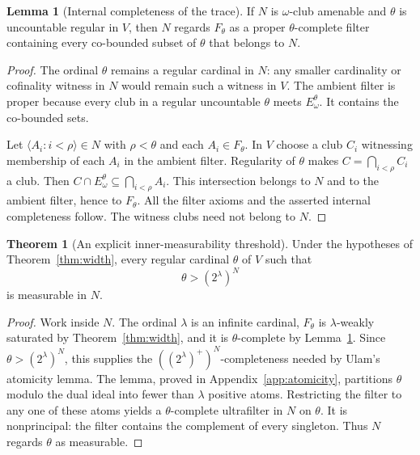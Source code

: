 \documentclass[11pt,letterpaper]{article}
\theoremstyle{definition}
\newtheorem{theorem}[definition]{Theorem}
\newtheorem{lemma}[definition]{Lemma}
\numberwithin{equation}{section}
\begin{document}
\begin{lemma}[Internal completeness of the trace]\label{lem:filtercomplete}
If $N$ is $\omega$-club amenable and $\theta$ is uncountable regular in
$V$, then $N$ regards $F_\theta$ as a proper $\theta$-complete filter
containing every co-bounded subset of $\theta$ that belongs to $N$.
\end{lemma}
\begin{proof}
The ordinal $\theta$ remains a regular cardinal in $N$: any smaller
cardinality or cofinality witness in $N$ would remain such a witness
in $V$. The ambient filter is proper because every club in a regular
uncountable $\theta$ meets $E^\theta_\omega$. It contains the
co-bounded sets.

Let $\langle A_i:i<\rho\rangle\in N$ with $\rho<\theta$ and each
$A_i\in F_\theta$. In $V$ choose a club $C_i$ witnessing membership
of each $A_i$ in the ambient filter. Regularity of $\theta$ makes
$C=\bigcap_{i<\rho}C_i$ a club. Then
$C\cap E^\theta_\omega\subseteq\bigcap_{i<\rho}A_i$.
This intersection belongs to $N$ and to the ambient filter, hence to
$F_\theta$. All the filter axioms and the asserted internal
completeness follow. The witness clubs need not belong to $N$.
\end{proof}

\begin{theorem}[An explicit inner-measurability threshold]\label{thm:measurable}
Under the hypotheses of Theorem~\ref{thm:width}, every regular cardinal
$\theta$ of $V$ such that
\[
\theta>(2^\lambda)^N
\]
is measurable in $N$.
\end{theorem}
\begin{proof}
Work inside $N$. The ordinal $\lambda$ is an infinite cardinal,
$F_\theta$ is $\lambda$-weakly saturated by
Theorem~\ref{thm:width}, and it is $\theta$-complete by
Lemma~\ref{lem:filtercomplete}. Since
$\theta>(2^\lambda)^N$, this supplies the
$((2^\lambda)^+)^N$-completeness needed by Ulam's atomicity lemma.
The lemma, proved in Appendix~\ref{app:atomicity}, partitions
$\theta$ modulo the dual ideal into fewer than $\lambda$ positive
atoms. Restricting the filter to any one of these atoms yields a
$\theta$-complete ultrafilter in $N$ on $\theta$. It is nonprincipal:
the filter contains the complement of every singleton. Thus $N$
regards $\theta$ as measurable.
\end{proof}
\end{document}
